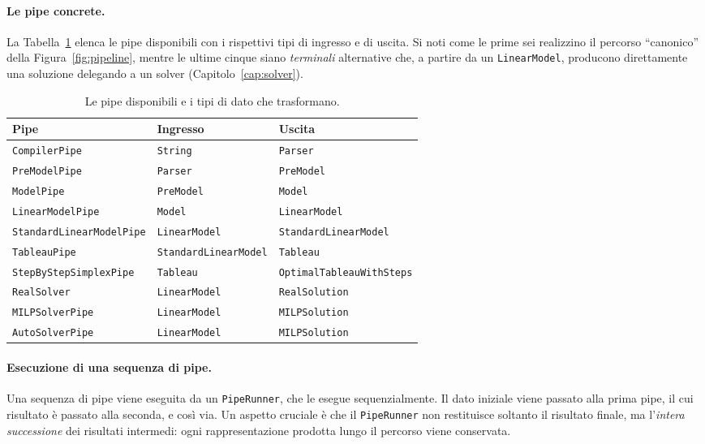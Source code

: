 \paragraph{Le pipe concrete.}
La Tabella~\ref{tab:pipes} elenca le pipe disponibili con i rispettivi tipi di
ingresso e di uscita. Si noti come le prime sei realizzino il percorso
``canonico'' della Figura~\ref{fig:pipeline}, mentre le ultime cinque siano
\emph{terminali} alternative che, a partire da un \texttt{LinearModel},
producono direttamente una soluzione delegando a un solver
(Capitolo~\ref{cap:solver}).

\begin{table}[ht]
\centering
\begin{tabular}{lll}
\hline
\textbf{Pipe} & \textbf{Ingresso} & \textbf{Uscita} \\
\hline
\texttt{CompilerPipe}            & \texttt{String}              & \texttt{Parser} \\
\texttt{PreModelPipe}            & \texttt{Parser}              & \texttt{PreModel} \\
\texttt{ModelPipe}               & \texttt{PreModel}            & \texttt{Model} \\
\texttt{LinearModelPipe}         & \texttt{Model}               & \texttt{LinearModel} \\
\texttt{StandardLinearModelPipe} & \texttt{LinearModel}         & \texttt{StandardLinearModel} \\
\texttt{TableauPipe}             & \texttt{StandardLinearModel} & \texttt{Tableau} \\
\texttt{StepByStepSimplexPipe}   & \texttt{Tableau}             & \texttt{OptimalTableauWithSteps} \\
\texttt{RealSolver}              & \texttt{LinearModel}         & \texttt{RealSolution} \\
\texttt{MILPSolverPipe}          & \texttt{LinearModel}         & \texttt{MILPSolution} \\
\texttt{AutoSolverPipe}          & \texttt{LinearModel}         & \texttt{MILPSolution} \\
\hline
\end{tabular}
\caption{Le pipe disponibili e i tipi di dato che trasformano.}
\label{tab:pipes}
\end{table}

\paragraph{Esecuzione di una sequenza di pipe.}
Una sequenza di pipe viene eseguita da un \texttt{PipeRunner}, che le esegue sequenzialmente. Il dato iniziale viene passato alla prima pipe, il
cui risultato è passato alla seconda, e così via. Un aspetto cruciale è che il
\texttt{PipeRunner} non restituisce soltanto il risultato finale, ma
l'\emph{intera successione} dei risultati intermedi: ogni rappresentazione
prodotta lungo il percorso viene conservata.

